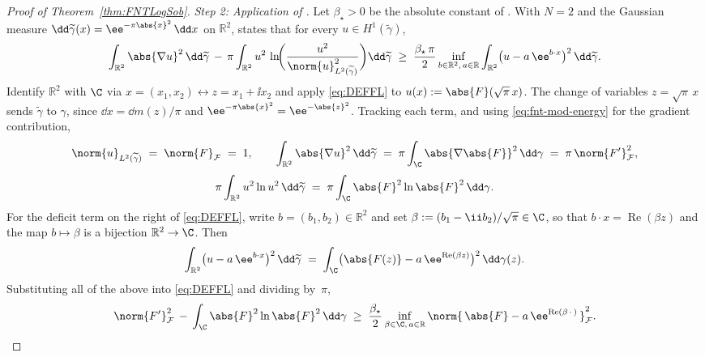 \begin{proof}[Proof of Theorem~\ref{thm:FNTLogSob}]
\medskip
\noindent
\emph{Step 2: Application of \cite[Corollary~1.2]{DolbeaultEstebanFigalliFrankLoss2025}.}\;
Let $\beta_\star > 0$ be the absolute constant of
\cite[Theorem~1.1]{DolbeaultEstebanFigalliFrankLoss2025}.  With $N = 2$ and the
Gaussian measure $\dd\widetilde{\gamma}(x) = \ee^{-\pi \abs{x}^2}\,\dd x$
on $\mathbb{R}^2$,
\cite[Corollary~1.2]{DolbeaultEstebanFigalliFrankLoss2025} states that for
every $u \in H^1(\widetilde{\gamma})$,
\begin{equation}\label{eq:DEFFL}
\int_{\mathbb{R}^2} \abs{\nabla u}^2\, \dd\widetilde{\gamma}
\,-\, \pi \int_{\mathbb{R}^2} u^2\, \ln\!\biggl(\frac{u^2}{\norm{u}_{L^2(\widetilde{\gamma})}^2}\biggr) \dd\widetilde{\gamma}
\;\ge\;
\frac{\beta_\star\, \pi}{2}
\inf_{b \in \mathbb{R}^2,\, a \in \mathbb{R}}
\int_{\mathbb{R}^2} \bigl(u - a\, \ee^{b\cdot x}\bigr)^2\, \dd\widetilde{\gamma}.
\end{equation}
Identify $\mathbb{R}^2$ with $\C$ via
$x = (x_1, x_2) \leftrightarrow z = x_1 + \ii x_2$ and apply
\eqref{eq:DEFFL} to $u(x) := \abs{F}(\sqrt{\pi}\, x)$.  The change of
variables $z = \sqrt{\pi}\, x$ sends $\widetilde{\gamma}$ to $\gamma$, since
$\dd x = \dd m(z) / \pi$ and
$\ee^{-\pi \abs{x}^2} = \ee^{-\abs{z}^2}$.  Tracking
each term, and using \eqref{eq:fnt-mod-energy} for the gradient contribution,
\[
\norm{u}_{L^2(\widetilde{\gamma})}
\;=\; \norm{F}_{\mathcal{F}} \;=\; 1,
\qquad
\int_{\mathbb{R}^2} \abs{\nabla u}^2\, \dd\widetilde{\gamma}
\;=\; \pi \int_{\C} \abs{\nabla \abs{F}}^2\, \dd\gamma
\;=\; \pi\, \norm{F'}_{\mathcal{F}}^2,
\]
\[
\pi \int_{\mathbb{R}^2} u^2 \ln u^2\, \dd\widetilde{\gamma}
\;=\; \pi \int_{\C} \abs{F}^2 \ln \abs{F}^2\, \dd\gamma.
\]
For the deficit term on the right of \eqref{eq:DEFFL}, write
$b = (b_1, b_2) \in \mathbb{R}^2$ and set
$\beta := (b_1 - \ii b_2) / \sqrt{\pi} \in \C$, so that
$b\cdot x = \operatorname{Re}(\beta z)$ and the map $b \mapsto \beta$ is a
bijection $\mathbb{R}^2 \to \C$.  Then
\[
\int_{\mathbb{R}^2} \bigl(u - a\, \ee^{b\cdot x}\bigr)^2\, \dd\widetilde{\gamma}
\;=\;
\int_{\C} \bigl(\abs{F(z)} - a\, \ee^{\operatorname{Re}(\beta z)}\bigr)^2\, \dd\gamma(z).
\]
Substituting all of the above into \eqref{eq:DEFFL} and dividing by~$\pi$,
\begin{equation}\label{eq:fnt-DEFFL-applied}
\norm{F'}_{\mathcal{F}}^2
\,-\, \int_{\C} \abs{F}^2 \ln \abs{F}^2\, \dd\gamma
\;\ge\;
\frac{\beta_\star}{2}
\inf_{\beta \in \C,\, a \in \mathbb{R}}
\norm{\, \abs{F} - a\, \ee^{\operatorname{Re}(\beta\,\cdot\,)} \,}_{\mathcal{F}}^2.
\end{equation}


\end{proof}
